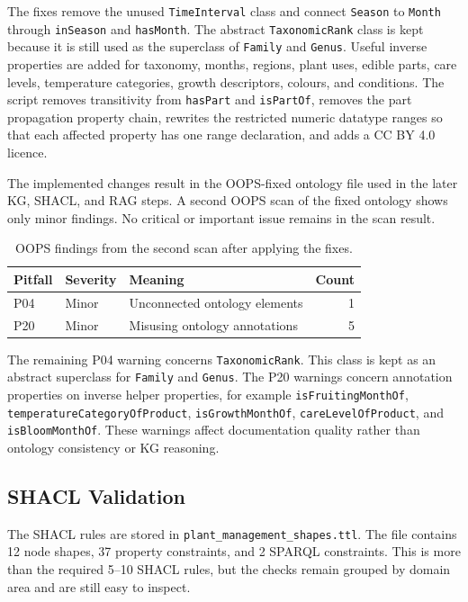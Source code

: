 \documentclass[11pt,a4paper]{article}
\newcommand{\artifact}[1]{\texttt{#1}}
\begin{document}
The fixes remove the unused \artifact{TimeInterval} class and connect
\artifact{Season} to \artifact{Month} through \artifact{inSeason} and
\artifact{hasMonth}. The abstract \artifact{TaxonomicRank} class is kept because
it is still used as the superclass of \artifact{Family} and \artifact{Genus}.
Useful inverse properties are added for taxonomy, months, regions, plant uses,
edible parts, care levels, temperature categories, growth descriptors, colours,
and conditions. The script removes transitivity from \artifact{hasPart} and
\artifact{isPartOf}, removes the part propagation property chain, rewrites the
restricted numeric datatype ranges so that each affected property has one range
declaration, and adds a CC BY 4.0 licence.

The implemented changes result in the OOPS-fixed ontology file used in the
later KG, SHACL, and RAG steps. A second OOPS scan of the fixed ontology shows
only minor findings. No critical or important issue remains in the scan result.

\begin{table}[h]
\centering
\begin{tabular}{lllr}
\toprule
Pitfall & Severity & Meaning & Count \\
\midrule
P04 & Minor & Unconnected ontology elements & 1 \\
P20 & Minor & Misusing ontology annotations & 5 \\
\bottomrule
\end{tabular}
\caption{OOPS findings from the second scan after applying the fixes.}
\label{tab:oops-second-scan}
\end{table}

The remaining P04 warning concerns \artifact{TaxonomicRank}. This class is kept
as an abstract superclass for \artifact{Family} and \artifact{Genus}. The P20
warnings concern annotation properties on inverse helper properties, for example
\artifact{isFruitingMonthOf}, \artifact{temperatureCategoryOfProduct},
\artifact{isGrowthMonthOf}, \artifact{careLevelOfProduct}, and
\artifact{isBloomMonthOf}. These warnings affect documentation quality rather
than ontology consistency or KG reasoning.

\subsection{SHACL Validation}

The SHACL rules are stored in
\artifact{plant\_management\_shapes.ttl}. The file contains 12 node shapes,
37 property constraints, and 2 SPARQL constraints. This is more than the
required 5--10 SHACL rules, but the checks remain grouped by domain area and
are still easy to inspect.
\end{document}
